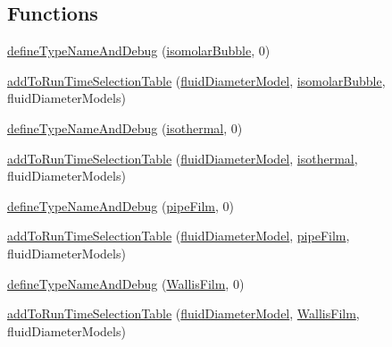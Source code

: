 \subsection*{Functions}
\begin{DoxyCompactItemize}
\item 
\hyperlink{namespaceFoam_1_1fluidDiameterModels_abc82f417c5655214c01ff6904c56f223}{define\+Type\+Name\+And\+Debug} (\hyperlink{classFoam_1_1fluidDiameterModels_1_1isomolarBubble}{isomolar\+Bubble}, 0)
\item 
\hyperlink{namespaceFoam_1_1fluidDiameterModels_a4e598d547c7d5849e6b431705e676818}{add\+To\+Run\+Time\+Selection\+Table} (\hyperlink{classFoam_1_1fluidDiameterModel}{fluid\+Diameter\+Model}, \hyperlink{classFoam_1_1fluidDiameterModels_1_1isomolarBubble}{isomolar\+Bubble}, fluid\+Diameter\+Models)
\item 
\hyperlink{namespaceFoam_1_1fluidDiameterModels_a1dcd6f0dbed411e478eb83b1a2d1a8d3}{define\+Type\+Name\+And\+Debug} (\hyperlink{classFoam_1_1fluidDiameterModels_1_1isothermal}{isothermal}, 0)
\item 
\hyperlink{namespaceFoam_1_1fluidDiameterModels_a72f1cbf47859e6a537bcf3df0a9a6996}{add\+To\+Run\+Time\+Selection\+Table} (\hyperlink{classFoam_1_1fluidDiameterModel}{fluid\+Diameter\+Model}, \hyperlink{classFoam_1_1fluidDiameterModels_1_1isothermal}{isothermal}, fluid\+Diameter\+Models)
\item 
\hyperlink{namespaceFoam_1_1fluidDiameterModels_ac3c54613358b111bc98ec9d8294164b8}{define\+Type\+Name\+And\+Debug} (\hyperlink{classFoam_1_1fluidDiameterModels_1_1pipeFilm}{pipe\+Film}, 0)
\item 
\hyperlink{namespaceFoam_1_1fluidDiameterModels_aa7202fceec6bdf7e34379499b781e53a}{add\+To\+Run\+Time\+Selection\+Table} (\hyperlink{classFoam_1_1fluidDiameterModel}{fluid\+Diameter\+Model}, \hyperlink{classFoam_1_1fluidDiameterModels_1_1pipeFilm}{pipe\+Film}, fluid\+Diameter\+Models)
\item 
\hyperlink{namespaceFoam_1_1fluidDiameterModels_a5846c1ae32920836cc561e23e5d2404c}{define\+Type\+Name\+And\+Debug} (\hyperlink{classFoam_1_1fluidDiameterModels_1_1WallisFilm}{Wallis\+Film}, 0)
\item 
\hyperlink{namespaceFoam_1_1fluidDiameterModels_ad459fb760d8abaf76f64eed23e194f06}{add\+To\+Run\+Time\+Selection\+Table} (\hyperlink{classFoam_1_1fluidDiameterModel}{fluid\+Diameter\+Model}, \hyperlink{classFoam_1_1fluidDiameterModels_1_1WallisFilm}{Wallis\+Film}, fluid\+Diameter\+Models)
\end{DoxyCompactItemize}


